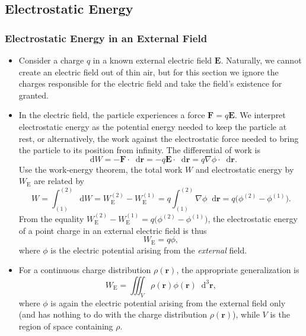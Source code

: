 \documentclass[11pt, a4paper]{article}
\newcommand{\diff}{\mathop{}\!\mathrm{d}} %
\newcommand{\dr}{\diff^{3} \r}  %
\renewcommand{\vec}[1]{\bm{#1}} %
\renewcommand{\r}{\vec{r}}
\newcommand{\E}{\vec{E}} %
\renewcommand{\grad}{\nabla}
\begin{document}
\subsection{Electrostatic Energy}
\subsubsection{Electrostatic Energy in an External Field}
\begin{itemize}
	\item Consider a charge $ q $ in a known external electric field $ \E $. Naturally, we cannot create an electric field out of thin air, but for this section we ignore the charges responsible for the electric field and take the field's existence for granted.
	

	
	\item In the electric field, the particle experiences a force $ \vec{F} = q \E $. We interpret electrostatic energy as the potential energy needed to keep the particle at rest, or alternatively, the work against the electrostatic force needed to bring the particle to its position from infinity. The differential of work is
	\begin{equation*}
		\diff W = - \vec{F} \cdot \diff \r = - q \E \cdot  \diff \r = q \grad \phi \cdot \diff \r.
	\end{equation*}
	Use the work-energy theorem, the total work $ W $ and electrostatic energy by $ W_{\text{E}} $ are related by
	 \begin{equation*}
		W = \int_{(1)}^{(2)} \diff W = W_{\text{E}}^{(2)} - W_{\text{E}}^{(1)} = q \int_{(1)}^{(2)}\grad \phi \diff \r = q\big(\phi^{(2) }- \phi^{(1)}\big).
	\end{equation*}
	From the equality $ W_{\text{E}}^{(2)} - W_{\text{E}}^{(1)} = q\big(\phi^{(2) }- \phi^{(1)}\big) $, the electrostatic energy of a point charge in an external electric field is thus
	\begin{equation*}
		W_{\text{E}} = q \phi,
	\end{equation*}
	where $ \phi $ is the electric potential arising from the \textit{external} field. 
	
	\item For a continuous charge distribution $ \rho(\r) $, the appropriate generalization is
	\begin{equation*}
		W_{\text{E}} = \iiint_{V} \rho(\r) \phi (\r) \dr,
	\end{equation*}
	where $ \phi $ is again the electric potential arising from the external field only (and has nothing to do with the charge distribution $ \rho(\r) $), while $ V $ is the region of space containing $ \rho $.
\end{itemize}
\end{document}
